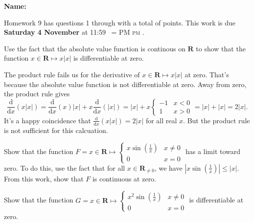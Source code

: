 \documentclass[12pt,fleqn,answers]{exam}
\makeatletter
\newcommand{\reals}{\mathbf{R}}
\newcommand{\quiz}{9}
\newcommand{\term}{Fall}
\DeclareRobustCommand{\maybefakesc}[1]{%
  \ifnum\pdfstrcmp{\f@series}{\bfdefault}=\z@
    {\fontsize{\dimexpr0.8\dimexpr\f@size pt\relax}{0}\selectfont\uppercase{#1}}%
  \else
    \textsc{#1}%
  \fi
}
\newcommand\PM{\,\maybefakesc{pm}\xspace}
\makeatother
\begin{document}
\large
\vspace{0.1in}
\noindent{}
{\bf Name:}  \\
\noindent \makebox[3.0truein][l]{\textbf{Homework \quiz, \term \/ \the\year}}
\vspace{0.1in}

\noindent  Homework \quiz\/  has questions 1 through  \numquestions \/ with a total 
of  \numpoints\/  points. 
This work is due \textbf{Saturday 4 November} at 11:59 \PM.

\vspace{0.1in}


\begin{questions}

\question [10] Use the fact that the absolute value function is continous
on $\reals$ to show that the function $x \in \reals \mapsto x |x|$ 
is differentiable at zero. 

\quad The product rule fails us for the derivative
of $x \in \reals \mapsto x |x|$ at zero. That's because 
the absolute value function is not differentiable at zero.
Away from zero, the product rule gives
\begin{equation*}
    \frac{\mathrm{d}}{\mathrm{d} x}
     \left(x |x| \right) = 
     \frac{\mathrm{d}}{\mathrm{d} x}
     \left(x \right) |x| + x \frac{\mathrm{d}}{\mathrm{d} x}
     \left(|x|  \right) =
       |x| + x \begin{cases} -1 & x < 0 \\ 1 & x > 0 \end{cases}
       = |x| + |x| = 2 |x|.
\end{equation*}
It's a happy coincidence that $\frac{\mathrm{d}}{\mathrm{d} x}
\left(x |x| \right) = 2 |x|$ for all real $x$. But the product 
rule is not sufficient for this calcuation.



\question [10] Show that the function $F = x \in \reals \mapsto \begin{cases}
    x \sin(\frac{1}{x}) & x \neq 0 \\
    0 & x = 0
\end{cases}$ has a limit toward zero.  To do this, use the 
fact that for all $x \in \reals_{\neq 0}$, we have $|x \sin(\frac{1}{x})| \leq |x|$.
From this work, show that $F$ is continuous at zero.


\question [10] Show that the function 
$G = x \in \reals \mapsto \begin{cases}
    x^2 \sin(\frac{1}{x}) & x \neq 0 \\ 0 & x = 0
\end{cases}$ 
is differentiable at zero.



\end{questions}
\end{document}
